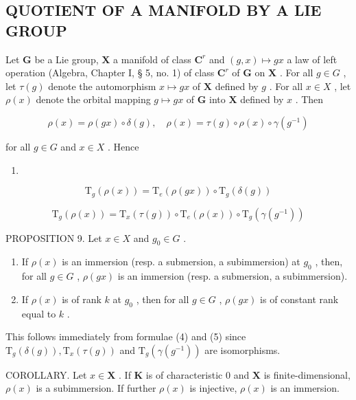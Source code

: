 \subsection{QUOTIENT OF A MANIFOLD BY A LIE GROUP}

Let \(\mathbf{G}\) be a Lie group, \(\mathbf{X}\) a manifold of class \(\mathbf{C}^r\) and \((g,x)\mapsto gx\) a law of left operation (Algebra, Chapter I, § 5, no. 1) of class \(\mathbf{C}^r\) of \(\mathbf{G}\) on \(\mathbf{X}\) . For all \(g\in G\) , let \(\tau (g)\) denote the automorphism \(x\mapsto gx\) of \(\mathbf{X}\) defined by \(g\) . For all \(x\in X\) , let \(\rho (x)\) denote the orbital mapping \(g\mapsto gx\) of \(\mathbf{G}\) into \(\mathbf{X}\) defined by \(x\) . Then

\[
\rho (x) = \rho (g x) \circ \delta (g), \quad \rho (x) = \tau (g) \circ \rho (x) \circ \gamma (g ^ {- 1})\tag{3}
\]

for all \(g\in G\) and \(x\in X\) . Hence

\begin{enumerate}
\def\labelenumi{(\arabic{enumi})}
\setcounter{enumi}{3}
\tightlist
\item
\end{enumerate}

\[
\mathrm{T} _ {g} (\rho (x)) = \mathrm{T} _ {e} (\rho (g x)) \circ \mathrm{T} _ {g} (\delta (g))
\]

\[
\mathrm{T} _ {g} (\rho (x)) = \mathrm{T} _ {x} (\tau (g)) \circ \mathrm{T} _ {e} (\rho (x)) \circ \mathrm{T} _ {g} (\gamma (g ^ {- 1}))\tag{5}
\]

PROPOSITION 9. Let \(x \in X\) and \(g_0 \in G\) .

\begin{enumerate}
\def\labelenumi{(\roman{enumi})}
\item
  If \(\rho(x)\) is an immersion (resp. a submersion, a subimmersion) at \(g_0\) , then, for all \(g \in G\) , \(\rho(gx)\) is an immersion (resp. a submersion, a subimmersion).
\item
  If \(\rho(x)\) is of rank \(k\) at \(g_0\) , then for all \(g \in G\) , \(\rho(gx)\) is of constant rank equal to \(k\) .
\end{enumerate}

This follows immediately from formulae (4) and (5) since \(\mathrm{T}_{g}(\delta(g)),\mathrm{T}_{x}(\tau(g))\) and \(\mathrm{T}_{g}(\gamma(g^{-1}))\) are isomorphisms.

COROLLARY. Let \(x \in \mathbf{X}\) . If \(\mathbf{K}\) is of characteristic 0 and \(\mathbf{X}\) is finite-dimensional, \(\rho(x)\) is a subimmersion. If further \(\rho(x)\) is injective, \(\rho(x)\) is an immersion.

